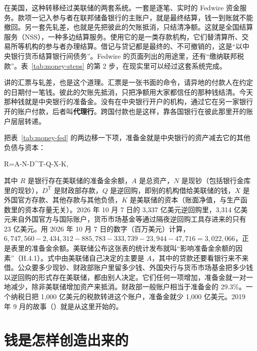 在美国，这种转移经过美联储的两套系统。一套是逐笔、实时的 Fedwire 资金服务。款项一记入参与者在联邦储备银行的主账户，就是最终结算\cite{frbs2026}，钱一到账就不能撤回。另一套先轧差，也就是先把彼此的欠账抵消，只结清净额。这就是全国结算服务（NSS），一种多边结算服务。使用它的是一类存款机构，它们替清算所、交易所等机构的参与者办理结算。借记与贷记都是最终的、不可撤销的，这是“以中央银行货币结算银行间债务”\cite{frbs2026}。Fedwire 的页面列出的用途里，还有“缴纳联邦税款”\cite{frbs2026}。表~\ref{tab:money-steps} 的第 2 步，在现实里可以经过这套系统完成。

讲的汇票与轧差，也是这个道理。汇票是一张书面的命令，请异地的付款人在约定的日期付一笔钱。彼此的欠账先抵消，只把净额用大家都信任的那种钱结清。今天那种钱就是中央银行的准备金。没有在中央银行开户的机构，通过它在另一家银行开的账户付款，后者叫\textbf{代理行}。跨国付款也是这样，靠各国银行在彼此那里开的账户层层转递。

\begin{deeper}[影响准备金的因素]
把表~\ref{tab:money-fed} 的两边移一下项，准备金就是中央银行的资产减去它的其他负债与资本：
\begin{keyeq}
R=A-N-D^{\mathrm T}-Q-X-K,\label{eq:money-reserves}
\end{keyeq}
其中 $R$ 是银行存在美联储的准备金余额，$A$ 是总资产，$N$ 是现钞（包括银行金库里的现钞），$D^{\mathrm T}$ 是财政部存款，$Q$ 是逆回购，即别的机构借给美联储的钱，$X$ 是外国官方存款、其他存款与其他负债，$K$ 是美联储的资本（账面净值，与生产函数里的资本存量无关）。2026 年 10 月 7 日的 3,337 亿美元逆回购里，3,314 亿美元来自外国官方与国际账户，货币市场基金等通过隔夜逆回购工具存进来的只有 23 亿美元。用 2026 年 10 月 7 日的数字（百万美元）计算，$6{,}747{,}560-2{,}434{,}312-885{,}783-333{,}739-23{,}944-47{,}716=3{,}022{,}066$，正是表里的准备金余额\cite{h41_2026}。美联储公布这张表的统计发布就叫“影响准备金余额的因素”（H.4.1）。式中由美联储自己决定的主要是 $A$，其中的贷款还要看银行来不来借。公众要多少现钞、财政部账户里留多少钱、外国央行与货币市场基金把多少钱以逆回购的形式存在美联储，都由别人决定。它们任何一项增加，准备金就一对一地减少，除非美联储增加资产来抵消。财政部一般账户相当于准备金的 29.3\%。一个纳税日把 1,000 亿美元的税款转进这个账户，准备金就少 1,000 亿美元。2019 年 9 月的故事（）就是从这里开始的。
\end{deeper}

\section{钱是怎样创造出来的}\label{sec:money-creation}

